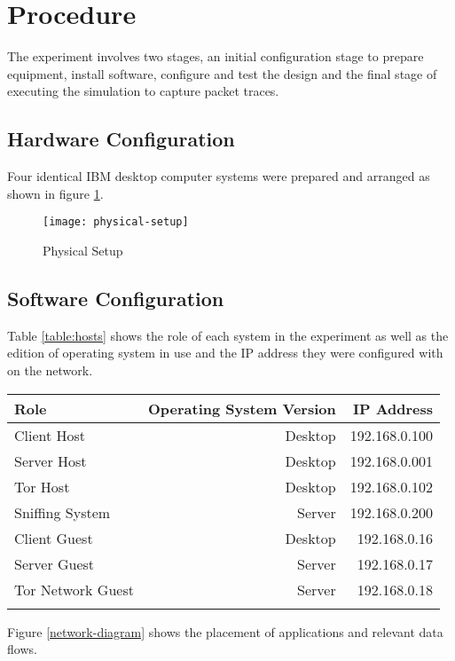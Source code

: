 \section{Procedure}

The experiment involves two stages, an initial configuration stage to prepare
equipment, install software, configure and test the design and the final stage
of executing the simulation to capture packet traces.

\subsection{Hardware Configuration}

Four identical IBM desktop computer systems were prepared and arranged as shown
in figure \ref{physical-setup}.

\begin{figure}[H]
  \centering\texttt{[image: physical-setup]}
  \caption{Physical Setup}
  \label{physical-setup}
\end{figure}

\subsection{Software Configuration}

Table \ref{table:hosts} shows the role of each system in the experiment as well
as the edition of operating system in use and the IP address they were
configured with on the network.

\begin{tabular}{lrr}
  \toprule
  Role & Operating System Version & IP Address\\
  \midrule
  Client Host & Desktop & 192.168.0.100\\
  Server Host & Desktop & 192.168.0.001\\
  Tor Host & Desktop & 192.168.0.102\\
  \midrule
  Sniffing System & Server & 192.168.0.200\\
  \midrule
  Client Guest & Desktop & 192.168.0.16\\
  Server Guest & Server & 192.168.0.17\\
  Tor Network Guest & Server & 192.168.0.18\\
  \bottomrule
  \label{table:hosts}
\end{tabular}

Figure \ref{network-diagram} shows the placement of applications and relevant
data flows.

